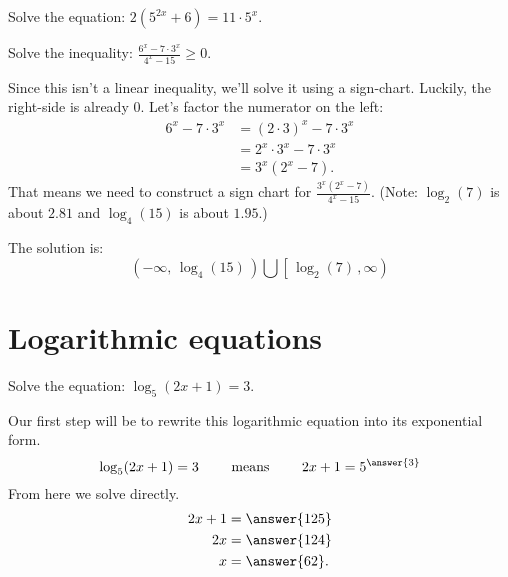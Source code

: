 \documentclass{ximera}
\begin{document}
\begin{problem}
	Solve the equation: $\displaystyle 2\left(5^{2x} + 6\right) = 11 \cdot 5^x$.
	\begin{selectAll}
	\end{selectAll}
\end{problem}

\begin{example}
	Solve the inequality: $\displaystyle \frac{6^x - 7 \cdot 3^x}{4^x - 15} \ge 0$.
	\begin{explanation}
		Since this isn't a linear inequality, we'll solve it using a sign-chart.  Luckily, the right-side is already $0$.  Let's factor the numerator on the left:
		\begin{align*} 
			6^x - 7 \cdot 3^x &= \left(2\cdot 3\right)^x - 7 \cdot 3^x \\
				&= 2^x \cdot 3^x - 7 \cdot 3^x\\
				&= 3^x \left( 2^x - 7 \right).
		\end{align*}
		That means we need to construct a sign chart for $\displaystyle \frac{3^x \left( 2^x - 7\right)}{4^x - 15}$.
		(Note: $\log_{2}(7)$ is about $2.81$ and $\log_{4}(15)$ is about $1.95$.)
		
		\begin{center}
		\end{center}
		The solution is:
		\[ \left( -\infty, \, \log_{4}(15) \, \right) \bigcup \left[ \,\log_{2}(7) \,, \infty \right) \]
	\end{explanation}
\end{example}
\section{Logarithmic equations}

\begin{example}
	Solve the equation: $\displaystyle \log_5( 2x+1) = 3$.
	\begin{explanation}
		Our first step will be to rewrite this logarithmic equation into its exponential form.
		\[ \log_5(2x+1) = 3 \qquad \textrm{ means } \qquad 2x+1 = 5^{\answer{3}} \]
		From here we solve directly.
		\begin{align*}
			2x+1 &= \answer{125}\\
			2x &= \answer{124}\\
			x &= \answer{62}.
		\end{align*}
	\end{explanation}
\end{example}
\end{document}
